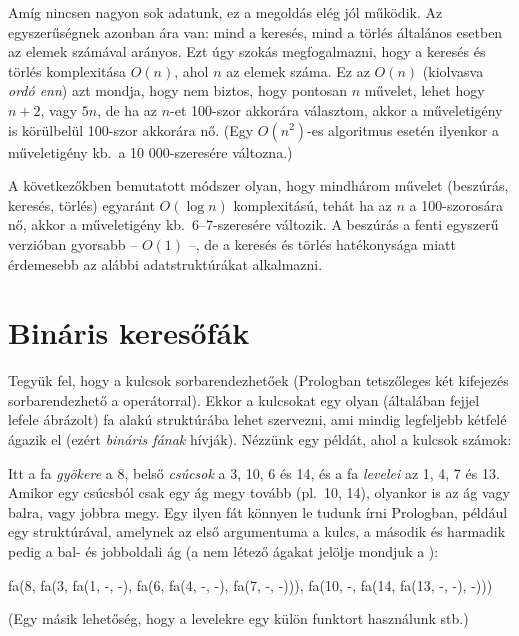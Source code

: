 Amíg nincsen nagyon sok adatunk, ez a megoldás elég
jól működik. Az egyszerűségnek azonban ára van: mind
a keresés, mind a törlés általános esetben az elemek
számával arányos. Ezt úgy szokás megfogalmazni, hogy
a keresés és törlés komplexitása $O(n)$, ahol $n$ az
elemek száma. Ez az $O(n)$ (kiolvasva \emph{ordó
enn}) azt mondja, hogy nem biztos, hogy pontosan $n$
művelet, lehet hogy $n+2$, vagy $5n$, de ha az
$n$-et 100-szor akkorára választom, akkor a
műveletigény is körülbelül 100-szor akkorára
nő. (Egy $O(n^2)$-es algoritmus esetén ilyenkor a
műveletigény kb.~a 10 000-szeresére változna.)

A következőkben bemutatott módszer olyan, hogy
mindhárom művelet (beszúrás, keresés, törlés)
egyaránt $O(\log n)$ komplexitású, tehát ha az $n$ a
100-szorosára nő, akkor a műveletigény
kb.~6--7-szeresére változik. A beszúrás a fenti
egyszerű verzióban gyorsabb -- $O(1)$ --, de a
keresés és törlés hatékonysága miatt érdemesebb az
alábbi adatstruktúrákat alkalmazni.

\section{Bináris keresőfák}
Tegyük fel, hogy a kulcsok sorbarendezhetőek
(Prologban tetszőleges két kifejezés sorbarendezhető
a  operátorral). Ekkor a kulcsokat egy olyan
(általában fejjel lefele ábrázolt) fa alakú
struktúrába lehet szervezni, ami mindig legfeljebb
kétfelé ágazik el (ezért \emph{bináris fának}
hívják). Nézzünk egy példát, ahol a kulcsok számok:

\begin{center}
\end{center}
Itt a fa \emph{gyökere} a 8, belső \emph{csúcsok} a
3, 10, 6 és 14, és a fa \emph{levelei} az 1, 4, 7 és
13. Amikor egy csúcsból csak egy ág megy tovább
(pl.~10, 14), olyankor is az ág vagy balra, vagy
jobbra megy. Egy ilyen fát könnyen le tudunk írni
Prologban, például egy  struktúrával, amelynek
az első argumentuma a kulcs, a második és harmadik
pedig a bal- és jobboldali ág (a nem létező ágakat
jelölje mondjuk a \pr{-}):
\begin{program}
fa(8, fa(3, fa(1, -, -),
            fa(6, fa(4, -, -),
                  fa(7, -, -))),
      fa(10, -,
             fa(14, fa(13, -, -),
                    -)))
\end{program}
(Egy másik lehetőség, hogy a levelekre egy külön
 funktort használunk stb.)

